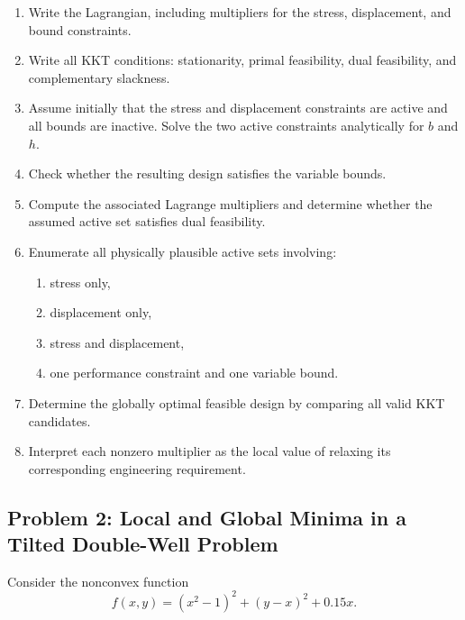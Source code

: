 \begin{enumerate}
    \item Write the Lagrangian, including multipliers for the stress,
    displacement, and bound constraints.

    \item Write all KKT conditions: stationarity, primal feasibility,
    dual feasibility, and complementary slackness.

    \item Assume initially that the stress and displacement constraints are
    active and all bounds are inactive. Solve the two active constraints
    analytically for $b$ and $h$.

    \item Check whether the resulting design satisfies the variable bounds.

    \item Compute the associated Lagrange multipliers and determine whether
    the assumed active set satisfies dual feasibility.

    \item Enumerate all physically plausible active sets involving:
    \begin{enumerate}
        \item stress only,
        \item displacement only,
        \item stress and displacement,
        \item one performance constraint and one variable bound.
    \end{enumerate}

    \item Determine the globally optimal feasible design by comparing all
    valid KKT candidates.

    \item Interpret each nonzero multiplier as the local value of relaxing
    its corresponding engineering requirement.
\end{enumerate}


\subsection*{Problem 2: Local and Global Minima in a Tilted Double-Well Problem}

Consider the nonconvex function
\begin{equation}
f(x,y)
=
(x^2-1)^2
+
(y-x)^2
+
0.15x.
\end{equation}

